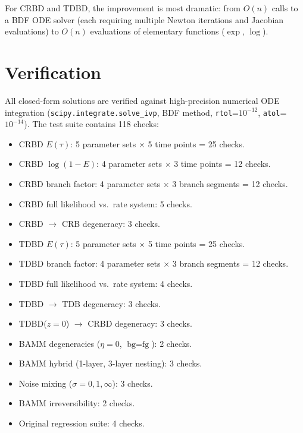 \documentclass[11pt,a4paper]{article}
\theoremstyle{plain}
\theoremstyle{definition}
\theoremstyle{remark}
\begin{document}
For CRBD and TDBD, the improvement is most dramatic: from $O(n)$ calls to a BDF ODE solver (each requiring multiple Newton iterations and Jacobian evaluations) to $O(n)$ evaluations of elementary functions ($\exp$, $\log$).

\section{Verification}
\label{sec:verification}

All closed-form solutions are verified against high-precision numerical ODE integration (\texttt{scipy.integrate.solve\_ivp}, BDF method, \texttt{rtol}=$10^{-12}$, \texttt{atol}=$10^{-14}$).
The test suite contains 118 checks:

\begin{itemize}[nosep]
  \item CRBD $E(\tau)$: 5 parameter sets $\times$ 5 time points = 25 checks.
  \item CRBD $\log(1-E)$: 4 parameter sets $\times$ 3 time points = 12 checks.
  \item CRBD branch factor: 4 parameter sets $\times$ 3 branch segments = 12 checks.
  \item CRBD full likelihood vs.\ rate system: 5 checks.
  \item CRBD $\to$ CRB degeneracy: 3 checks.
  \item TDBD $E(\tau)$: 5 parameter sets $\times$ 5 time points = 25 checks.
  \item TDBD branch factor: 4 parameter sets $\times$ 3 branch segments = 12 checks.
  \item TDBD full likelihood vs.\ rate system: 4 checks.
  \item TDBD $\to$ TDB degeneracy: 3 checks.
  \item TDBD($z=0$) $\to$ CRBD degeneracy: 3 checks.
  \item BAMM degeneracies ($\eta=0$, $\text{bg}=\text{fg}$): 2 checks.
  \item BAMM hybrid (1-layer, 3-layer nesting): 3 checks.
  \item Noise mixing ($\sigma=0,1,\infty$): 3 checks.
  \item BAMM irreversibility: 2 checks.
  \item Original regression suite: 4 checks.
\end{itemize}
\end{document}
